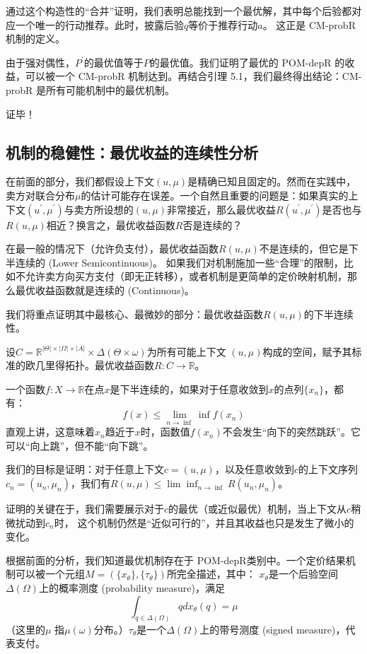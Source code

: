 通过这个构造性的“合并”证明，我们表明总能找到一个最优解，其中每个后验都对应一个唯一的行动推荐。此时，披露后验$q$等价于推荐行动$a$。
这正是 CM-probR 机制的定义。

由于强对偶性，$P^\prime$的最优值等于$P$的最优值。我们证明了最优的 POM-depR 的收益，可以被一个 CM-probR 机制达到。再结合引理 5.1，我们最终得出结论：CM-probR 是所有可能机制中的最优机制。

证毕！

\subsection{机制的稳健性：最优收益的连续性分析}

在前面的部分，我们都假设上下文$(u,\mu)$是精确已知且固定的。然而在实践中，卖方对联合分布$\mu$的估计可能存在误差。一个自然且重要的问题是：如果真实的上下文$(u^\prime,\mu^\prime)$与卖方所设想的$(u,\mu)$非常接近，那么最优收益$R(u^\prime,\mu^\prime)$是否也与$R(u,\mu)$相近？换言之，最优收益函数$R$否是连续的？

在最一般的情况下（允许负支付），最优收益函数$R(u,\mu)$不是连续的，但它是下半连续的 (Lower Semicontinuous)。
如果我们对机制施加一些“合理”的限制，比如不允许卖方向买方支付（即无正转移），或者机制是更简单的定价映射机制，那么最优收益函数就是连续的 (Continuous)。

我们将重点证明其中最核心、最微妙的部分：最优收益函数$R(u,\mu)$的下半连续性。

设$C=\mathbb{R}^{|\Theta|\times |\Omega|\times |A|}\times \Delta (\Theta\times \omega)$为所有可能上下文
$(u,\mu)$构成的空间，赋予其标准的欧几里得拓扑。最优收益函数$R:C\to \mathbb{R}$。

一个函数$f:X\to \mathbb{R}$在点$x$是下半连续的，如果对于任意收敛到$x$的点列$\{x_n\}$，都有：
$$f(x)\leq \lim\limits_{n\to \inf}\inf f(x_n)$$
直观上讲，这意味着$x_n$趋近于$x$时，函数值$f(x_n)$不会发生“向下的突然跳跃”。它可以“向上跳”，但不能“向下跳”。

我们的目标是证明：对于任意上下文$c=(u,\mu)$，以及任意收敛到$c$的上下文序列$c_n = (u_n,\mu_n)$，我们有$R(u,\mu)\leq \lim \inf_{n\to \inf} R(u_n,\mu_n)$。

证明的关键在于，我们需要展示对于$c$的最优（或近似最优）机制，当上下文从$c$稍微扰动到$c_n$时，
这个机制仍然是“近似可行的”，并且其收益也只是发生了微小的变化。

根据前面的分析，我们知道最优机制存在于 POM-depR类别中。一个定价结果机制可以被一个元组$M=(\{x_{\theta}\},\{\tau_{\theta}\})$所完全描述，其中：
$x_\theta$是一个后验空间$\Delta (\Omega)$上的概率测度 (probability measure)，满足$$\int_{q\in \Delta(\Omega)}q d x_{\theta}(q) = \mu$$（这里的$\mu$
指$\mu(\omega)$分布。）$\tau_\theta$是一个$\Delta(\Omega)$上的带号测度 (signed measure)，代表支付。

